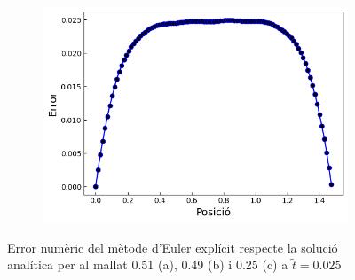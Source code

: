 \documentclass{article}
\begin{document}
\begin{figure}[h]
\begin{subfigure}[b]{0.32\textwidth}
        \includegraphics[width=\textwidth]{images/Error_vs_pos_at3.png}
        \caption{} 
        \label{fig:err_euler_exp_at2}
    \end{subfigure}
    \caption{Error numèric del mètode d'Euler explícit respecte la solució analítica per al mallat 0.51 (a), 0.49 (b) i 0.25 (c) a $\tilde{t}=0.025$}
    \label{fig:err_euler_explicit}
\end{figure}
\end{document}
